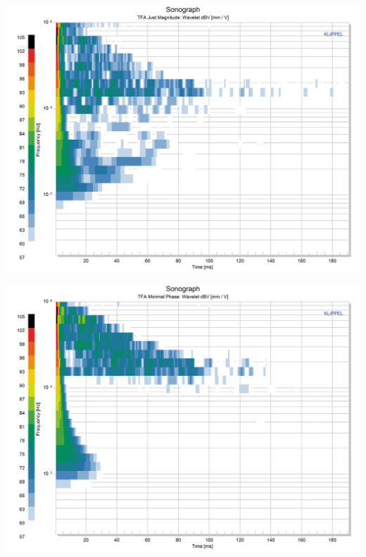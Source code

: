 \documentclass{report}
\begin{document}
\begin{minipage}{0.33333333\textwidth}
\begin{center}
	\includegraphics[width=\textwidth]{RoomComp/Sonograph_MagFilt} 
    \captionsetup{hypcap=false} 
	\label{fig:comp_mag}
\end{center}
\end{minipage}
\begin{minipage}{0.33333333\textwidth}
\begin{center}
	\includegraphics[width=\textwidth]{RoomComp/Sonograph_MinPhase} 
    \captionsetup{hypcap=false} 
	\label{fig:comp_minphase}
\end{center}
\end{minipage}
\end{document}
